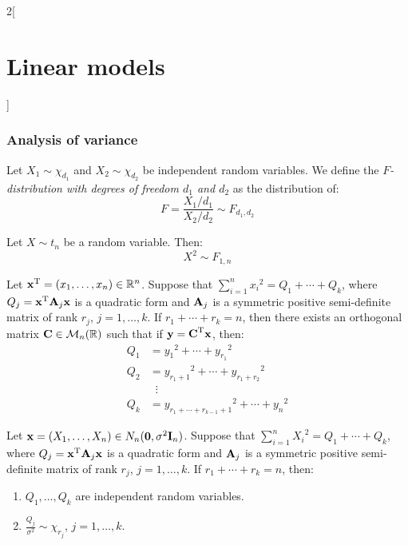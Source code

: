 \documentclass[../../../main_math.tex]{subfiles}
\begin{document}
\begin{multicols}{2}[\section{Linear models}]
  \subsubsection{Analysis of variance}
  \begin{definition}
    Let $X_1\sim{\chi_{d_1}}$ and $X_2\sim{\chi_{d_2}}$ be independent random variables. We define the \emph{$F$-distribution with degrees of freedom $d_1$ and $d_2$} as the distribution of: $$F=\frac{X_1/d_1}{X_2/d_2}\sim F_{d_1, d_2}$$
  \end{definition}
  \begin{proposition}\label{LM_tF}
    Let $X\sim t_n$ be a random variable. Then: $$X^2\sim F_{1,n}$$
  \end{proposition}
  \begin{lemma}
    Let ${\boldsymbol{\mathrm{x}}}^{\mathrm{T}}=(x_1,\ldots,x_n)\in\mathbb{R}^n$. Suppose that $\sum_{i=1}^n {x_i}^2=Q_1+\cdots+Q_k$, where $Q_j={\boldsymbol{\mathrm{x}}}^{\mathrm{T}}\boldsymbol{\mathrm{A}}_j\boldsymbol{\mathrm{x}}$ is a quadratic form and $\boldsymbol{\mathrm{A}}_j$ is a symmetric positive semi-definite matrix of rank $r_j$, $j=1,\ldots,k$. If $r_1+\cdots+r_k=n$, then there exists an orthogonal matrix $\boldsymbol{\mathrm{C}}\in\mathcal{M}_n(\mathbb{R})$ such that if $\boldsymbol{\mathrm{y}}={\boldsymbol{\mathrm{C}}}^{\mathrm{T}}\boldsymbol{\mathrm{x}}$, then:
    \begin{equation*}
      \begin{aligned}
        Q_1 & = {y_1}^2+\cdots+{y_{r_1}}^2                    \\
        Q_2 & = {y_{r_1+1}}^2+\cdots+{y_{r_1+r_2}}^2          \\
            & \;\;\vdots                                      \\
        Q_k & = {y_{r_1+\cdots+r_{k-1}+1}}^2+\cdots+{y_{n}}^2
      \end{aligned}
    \end{equation*}
  \end{lemma}
  \begin{theorem}
    Let $\boldsymbol{\mathrm{x}}=(X_1,\ldots,X_n)\in N_n(\boldsymbol{\mathrm{0}},\sigma^2\boldsymbol{\mathrm{I}}_n)$. Suppose that $\sum_{i=1}^n {X_i}^2=Q_1+\cdots+Q_k$, where $Q_j={\boldsymbol{\mathrm{x}}}^{\mathrm{T}}\boldsymbol{\mathrm{A}}_j\boldsymbol{\mathrm{x}}$ is a quadratic form and $\boldsymbol{\mathrm{A}}_j$ is a symmetric positive semi-definite matrix of rank $r_j$, $j=1,\ldots,k$. If $r_1+\cdots+r_k=n$, then:
    \begin{enumerate}
      \item $Q_1,\ldots,Q_k$ are independent random variables.
      \item $\frac{Q_j}{\sigma^2}\sim{\chi_{r_j}}$, $j=1,\ldots,k$.
    \end{enumerate}
  \end{theorem}

\end{multicols}
\end{document}
